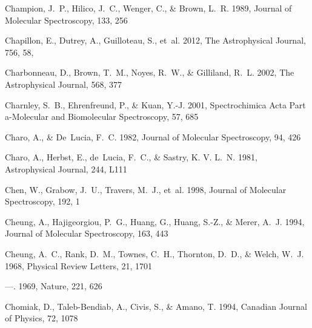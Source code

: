 \documentclass[twocolumn]{aastex631}
\begin{document}
\begin{thebibliography}{}
Champion, J.~P., Hilico, J.~C., Wenger, C., \& Brown, L.~R. 1989, Journal of
  Molecular Spectroscopy, 133, 256

{Chapillon}, E., {Dutrey}, A., {Guilloteau}, S., {et~al.} 2012, The
  Astrophysical Journal, 756, 58, 

Charbonneau, D., Brown, T.~M., Noyes, R.~W., \& Gilliland, R.~L. 2002, The
  Astrophysical Journal, 568, 377

Charnley, S.~B., Ehrenfreund, P., \& Kuan, Y.-J. 2001, Spectrochimica Acta Part
  a-Molecular and Biomolecular Spectroscopy, 57, 685

Charo, A., \& De~Lucia, F.~C. 1982, Journal of Molecular Spectroscopy, 94, 426

Charo, A., Herbst, E., de~Lucia, F.~C., \& Sastry, K. V. L.~N. 1981,
  Astrophysical Journal, 244, L111

Chen, W., Grabow, J.~U., Travers, M.~J., {et~al.} 1998, Journal of Molecular
  Spectroscopy, 192, 1

Cheung, A., Hajigeorgiou, P.~G., Huang, G., Huang, S.-Z., \& Merer, A.~J. 1994,
  Journal of Molecular Spectroscopy, 163, 443

Cheung, A.~C., Rank, D.~M., Townes, C.~H., Thornton, D.~D., \& Welch, W.~J.
  1968, Physical Review Letters, 21, 1701

---. 1969, Nature, 221, 626

Chomiak, D., Taleb-Bendiab, A., Civis, S., \& Amano, T. 1994, Canadian Journal
  of Physics, 72, 1078


\end{thebibliography}
\end{document}
